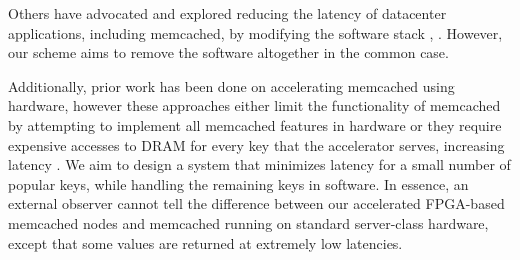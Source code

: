 Others have advocated and explored reducing the latency of datacenter 
applications, including memcached, by modifying the software stack 
\cite{rumbleHotos}, \cite{memcachefacebook}. However, 
our scheme aims to remove the software altogether in the common case. 

Additionally, prior work has been done on accelerating memcached using
hardware, however these approaches either limit the functionality of memcached
by attempting to implement all memcached features in hardware \cite{memcachedappliance} 
or they require expensive accesses to DRAM for every key that the accelerator 
serves, increasing latency \cite{memcachedDRAMaccel}. We aim to design a system that minimizes latency for 
a small number of popular keys, while handling the remaining keys in software.
In essence, an external observer cannot tell the difference between our 
accelerated FPGA-based memcached nodes and memcached running on standard 
server-class hardware, except that some values are returned at extremely low latencies.
